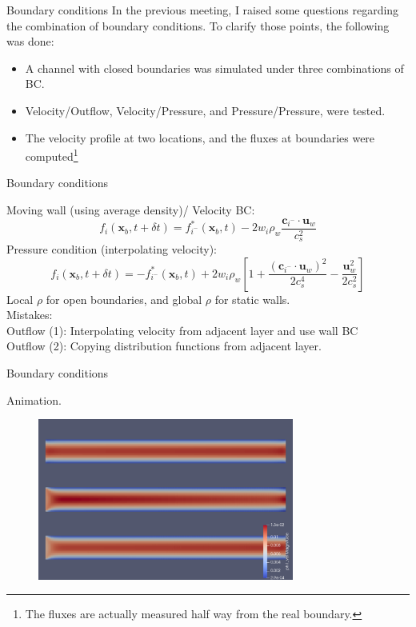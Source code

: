 \documentclass{beamer}
\begin{document}
	\begin{frame}{Boundary conditions}
		In the previous meeting, I raised some questions regarding the combination of boundary conditions. To clarify those points, the following was done:
		
		\begin{itemize}
			\item A channel with closed boundaries was simulated under three combinations of BC.
			\item Velocity/Outflow, Velocity/Pressure, and Pressure/Pressure, were tested.
			\item The velocity profile at two locations, and the fluxes at boundaries were computed\footnote{The fluxes are actually measured half way from the real boundary.}
		\end{itemize}
	\end{frame}
	
	\begin{frame}{Boundary conditions}
		
		Moving wall (using average density)/ Velocity BC:
		\begin{equation*}
		f_{i}(\mathbf{x}_b,t+\delta t) = f^*_{i^-}(\mathbf{x}_b,t) - 2 w_i \rho_w \frac{\mathbf{c}_{i^-} \cdot \mathbf{u}_w}{c_s^2}
		\end{equation*}
		Pressure condition (interpolating velocity):
		\begin{equation*}
		f_{i}(\mathbf{x}_b,t + \delta t) = - f^*_{i^-}(\mathbf{x}_b,t) + 2 w_i \rho_w \left[1+\frac{(\mathbf{c}_{i^-} \cdot \mathbf{u}_w)^2}{2c_s^4} - \frac{\mathbf{u}^2_w}{2c^2_s} \right]
		\end{equation*}
		Local $\rho$ for open boundaries, and global $\rho$ for static walls.\\
		{\color{red}
			Mistakes:\\
			Outflow (1): Interpolating velocity from adjacent layer and use wall BC\\
			Outflow (2): Copying distribution functions from adjacent layer. }
		
	\end{frame}
	
	
	\begin{frame}{Boundary conditions}
		
		Animation.
		\begin{figure}
			\centering
			\includegraphics[width=0.75\textwidth]{pics/channelBCComparision.png}
		\end{figure}
	\end{frame}
	
\end{document}
